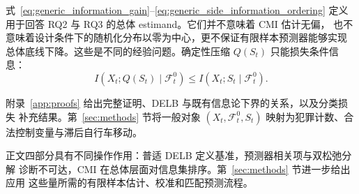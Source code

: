 式~\eqref{eq:generic_information_gain}--\eqref{eq:generic_side_information_ordering}
定义用于回答 RQ2 与 RQ3 的总体 estimand。它们并不意味着 CMI 估计无偏，
也不意味着设计条件下的随机化分布以零为中心，更不保证有限样本预测器能够实现
总体底线下降。这些是不同的经验问题。确定性压缩 \(Q(S_t)\) 只能损失条件信息：
\begin{equation}
I(X_t;Q(S_t)\mid\mathcal F_t^0)
\leq
I(X_t;S_t\mid\mathcal F_t^0).
\label{eq:generic_data_processing}
\end{equation}

附录~\ref{app:proofs} 给出完整证明、DELB 与既有信息论下界的关系，以及分类损失
补充结果。第~\ref{sec:methods} 节将一般对象
\((X_t,\mathcal F_t^0,S_t)\) 映射为犯罪计数、合法控制变量与滞后自行车移动。

正文四部分具有不同操作作用：普适 DELB 定义基准，预测器相关项与双松弛分解
诊断不可达，CMI 在总体层面对信息集排序。第~\ref{sec:methods} 节进一步给出应用
这些量所需的有限样本估计、校准和匹配预测流程。
